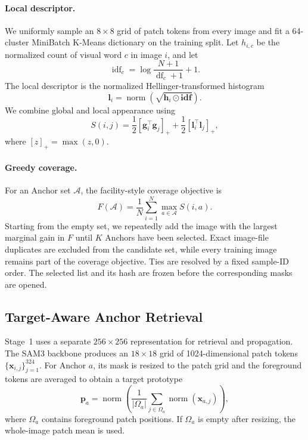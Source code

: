 \documentclass[a4paper,fleqn]{cas-dc}
\begin{document}
\paragraph{Local descriptor.}
We uniformly sample an $8\times8$ grid of patch tokens from every image and fit a 64-cluster MiniBatch K-Means dictionary on the training split. Let $h_{i,c}$ be the normalized count of visual word $c$ in image $i$, and let
\begin{equation}
\operatorname{idf}_c=\log\frac{N+1}{\operatorname{df}_c+1}+1.
\end{equation}
The local descriptor is the normalized Hellinger-transformed histogram
\begin{equation}
\mathbf{l}_i=\operatorname{norm}\left(\sqrt{\mathbf{h}_i\odot\mathbf{idf}}\right).
\end{equation}
We combine global and local appearance using
\begin{equation}
S(i,j)=\frac{1}{2}\left[\mathbf{g}_i^{\top}\mathbf{g}_j\right]_+
+\frac{1}{2}\left[\mathbf{l}_i^{\top}\mathbf{l}_j\right]_+,
\end{equation}
where $[z]_+=\max(z,0)$.

\paragraph{Greedy coverage.}
For an Anchor set $\mathcal{A}$, the facility-style coverage objective is
\begin{equation}
F(\mathcal{A})=\frac{1}{N}\sum_{i=1}^{N}\max_{a\in\mathcal{A}}S(i,a).
\end{equation}
Starting from the empty set, we repeatedly add the image with the largest marginal gain in $F$ until $K$ Anchors have been selected. Exact image-file duplicates are excluded from the candidate set, while every training image remains part of the coverage objective. Ties are resolved by a fixed sample-ID order. The selected list and its hash are frozen before the corresponding masks are opened.

\subsection{Target-Aware Anchor Retrieval}\label{sec:target-pooling}

Stage~1 uses a separate $256\times256$ representation for retrieval and propagation. The SAM3 backbone produces an $18\times18$ grid of 1024-dimensional patch tokens $\{\mathbf{x}_{i,j}\}_{j=1}^{324}$. For Anchor $a$, its mask is resized to the patch grid and the foreground tokens are averaged to obtain a target prototype
\begin{equation}
\mathbf{p}_a=\operatorname{norm}\left(
\frac{1}{|\Omega_a|}\sum_{j\in\Omega_a}\operatorname{norm}(\mathbf{x}_{a,j})
\right),
\end{equation}
where $\Omega_a$ contains foreground patch positions. If $\Omega_a$ is empty after resizing, the whole-image patch mean is used.
\end{document}
